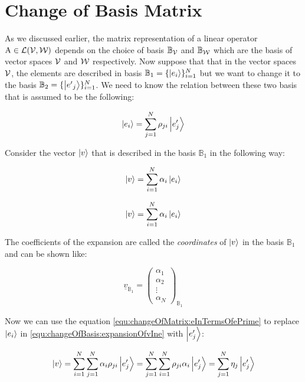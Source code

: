 \section{Change of Basis Matrix}

As we discussed earlier, the matrix representation of a linear operator $\operatorname{A} \in \mathcal{L}(\mathcal{V},\mathcal{W})$ depends on the choice of basis $\mathbb{B}_{\mathcal{V}}$ and $\mathbb{B}_{\mathcal{W}}$ which are the basis of vector spaces $\mathcal{V}$ and $ \mathcal{W} $ respectively. Now suppose that that in the vector spaces $\mathcal{V}$, the elements are described in basis $\mathbb{B}_1 = \{ \ket{e_i} \}_{i=1}^{N}$ but we want to change it to the basis $\mathbb{B}_{2} = \{ \ket{{e'}_{j}} \}_{i=1}^{N}$. We need to know the relation between these two basis that is assumed to be the following:

\begin{equation}
	\ket{e_i} = \sum_{j=1}^{N} \rho_{ji} \ket{e'_{j}}
	\label{equ:changeOfMatrix:eInTermsOfePrime}
\end{equation}

Consider the vector $\ket{v}$ that is described in the basis $\mathbb{B}_1$ in the following way: 

\begin{equation}
	\ket{v} = \sum_{i=1}^{N} \alpha_i \ket{e_i} 
	\label{equ:changeOfBasis:expansionOfvIne}
\end{equation}

\[ \ket{v} = \sum_{i=1}^{N} \alpha_i \ket{e_i} \] 

The coefficients of the expansion are called the \emph{coordinates} of $\ket{v}$ in the basis $\mathbb{B}_1$ and can be shown like:

\begin{equation}
	\underline{v}_{\mathbb{B}_1} = \begin{pmatrix}
		\alpha_1 \\
		\alpha_2 \\
		\vdots \\
		\alpha_N
	\end{pmatrix}_{\mathbb{B}_1}
\end{equation}

Now we can use the equation \ref{equ:changeOfMatrix:eInTermsOfePrime} to replace $\ket{e_i}$ in \ref{equ:changeOfBasis:expansionOfvIne} with $\ket{e'_j}$:

\begin{equation}
	\ket{v} = \sum_{i=1}^{N} \sum_{j=1}^{N}\alpha_i \rho_{ji} \ket{e'_j} = \sum_{j=1}^{N} \sum_{i=1}^{N}\rho_{ji} \alpha_i  \ket{e'_j}  = \sum_{j=1}^{N} \eta_j \ket{e'_j}
	\label{equ:chanbeOfBasis:vInNewBasis}
\end{equation}

